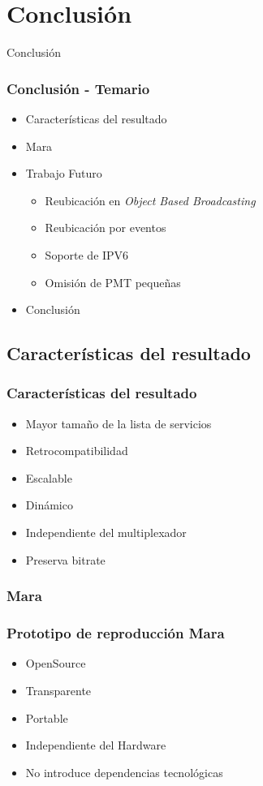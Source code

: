\documentclass[a4paper,11pt]{beamer}
\begin{document}
\section{Conclusión}	

\begin{frame}

\begin{center}
\Huge Conclusión
\end{center}

\end{frame}

	\begin{frame}
		\frametitle{Conclusión - Temario}
		\begin{itemize}
		\item Características del resultado
		\item Mara
		\item Trabajo Futuro
		\begin{itemize}
			\item Reubicación en \emph{Object Based Broadcasting}
			\item Reubicación por eventos
			\item Soporte de IPV6
			\item Omisión de PMT pequeñas
		\end{itemize}
		\item Conclusión
	\end{itemize}
	\end{frame}
	\subsection{Características del resultado}
	\begin{frame}
		\frametitle{Características del resultado}
		\begin{itemize}
		\item Mayor tamaño de la lista de servicios
		\item Retrocompatibilidad
		\item Escalable
		\item Dinámico
		\item Independiente del multiplexador
		\item Preserva bitrate
		\end{itemize}
	\end{frame}

		\subsubsection{Mara}
		\begin{frame}
			\frametitle{Prototipo de reproducción Mara}
			\begin{itemize}
			\item OpenSource
			\item Transparente
			\item Portable
			\item Independiente del Hardware
			\item No introduce dependencias tecnológicas
			\end{itemize}
		\end{frame}
	
\end{document}
